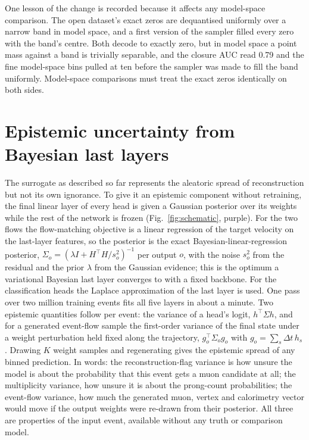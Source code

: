 \documentclass[11pt]{article}
\begin{document}
One lesson of the change is recorded because it affects any model-space comparison. The open dataset's exact
zeros are dequantised uniformly over a narrow band in model space, and a first version of the sampler filled
every zero with the band's centre. Both decode to exactly zero, but in model space a point mass against a band
is trivially separable, and the closure AUC read 0.79 and the fine model-space bins pulled at ten before the
sampler was made to fill the band uniformly. Model-space comparisons must treat the exact zeros identically on
both sides.

\begin{table}[h]\centering\footnotesize

\caption{Previous model (exact zeros dequantised) against the present zero-flag model, both at 10\,MeV with
neutrons. Closure AUC as marginal / truth-conditional; marginal pull RMS over the bins of
Table~\ref{tab:bayes-bins}, model A, test control / held-out 2p2h, epistemic term only, for all observables and
for the non-calorimetry set (without the two non-vertex calorimetric quantities); training time for both stages
on one RTX~3090.}
\label{tab:zero-compare}
\end{table}
\FloatBarrier

\section{Epistemic uncertainty from Bayesian last layers}
\label{sec:bayes}

The surrogate as described so far represents the aleatoric spread of reconstruction but not its own
ignorance. To give it an epistemic component without retraining, the final linear layer of every head is
given a Gaussian posterior over its weights while the rest of the network is frozen (Fig.~\ref{fig:schematic},
purple). For the two flows the flow-matching objective is a linear regression of the target velocity on the
last-layer features, so the posterior is the exact Bayesian-linear-regression posterior,
$\Sigma_o = (\lambda I + H^\top H/s_o^2)^{-1}$ per output $o$, with the noise $s_o^2$ from the residual and the
prior $\lambda$ from the Gaussian evidence; this is the optimum a variational Bayesian last layer converges to
with a fixed backbone. For the classification heads the Laplace approximation of the last layer is used. One
pass over two million training events fits all five layers in about a minute. Two epistemic quantities follow
per event: the variance of a head's logit, $h^\top \Sigma h$, and for a generated event-flow sample the
first-order variance of the final state under a weight perturbation held fixed along the trajectory,
$g_o^\top \Sigma_o g_o$ with $g_o = \sum_s \Delta t\, h_s$. Drawing $K$ weight samples and regenerating gives
the epistemic spread of any binned prediction. In words: the reconstruction-flag variance is how unsure the model
is about the probability that this event gets a muon candidate at all; the multiplicity variance, how unsure it is
about the prong-count probabilities; the event-flow variance, how much the generated muon, vertex and calorimetry
vector would move if the output weights were re-drawn from their posterior. All three are properties of the
input event, available without any truth or comparison model.
\end{document}
